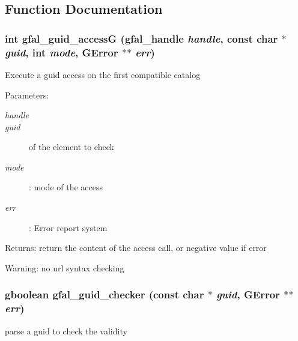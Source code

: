 \subsection{Function Documentation}
\subsubsection{\setlength{\rightskip}{0pt plus 5cm}int gfal\_\-guid\_\-access\-G (gfal\_\-handle {\em handle}, const char $\ast$ {\em guid}, int {\em mode}, GError $\ast$$\ast$ {\em err})}\label{gfal__common__guid_8h_55770e13f0626b60b830e3254df7ee9d}


Execute a guid access on the first compatible catalog \begin{Desc}
\item[Parameters:]
\begin{description}
\item[{\em handle}]\item[{\em guid}]of the element to check \item[{\em mode}]: mode of the access \item[{\em err}]: Error report system \end{description}
\end{Desc}
\begin{Desc}
\item[Returns:]return the content of the access call, or negative value if error \end{Desc}
\begin{Desc}
\item[Warning:]no url syntax checking \end{Desc}
\subsubsection{\setlength{\rightskip}{0pt plus 5cm}gboolean gfal\_\-guid\_\-checker (const char $\ast$ {\em guid}, GError $\ast$$\ast$ {\em err})}\label{gfal__common__guid_8h_9e4b6149b0256f725bc1dab5fc32ab62}


parse a guid to check the validity 

